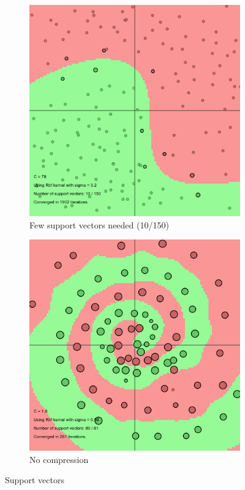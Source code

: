 \documentclass[11pt, a4paper]{article}
\begin{document}
\begin{figure}[H]
    \centering
    \begin{subfigure}{.5\textwidth}
      \centering
      \includegraphics[width=0.9\linewidth]{1-2-1-kernel7.png}
      \caption{Few support vectors needed (10/150)}
      \label{fig:ker7reduced}
    \end{subfigure}%
    \begin{subfigure}{.5\textwidth}
      \centering
      \includegraphics[width=0.9\linewidth]{1-2-1-kernel7spiral.png}
      \caption{No compression}
      \label{fig:ker7spiral}
    \end{subfigure}
    \caption{Support vectors}
    \label{fig:ker7}
\end{figure}
\end{document}
